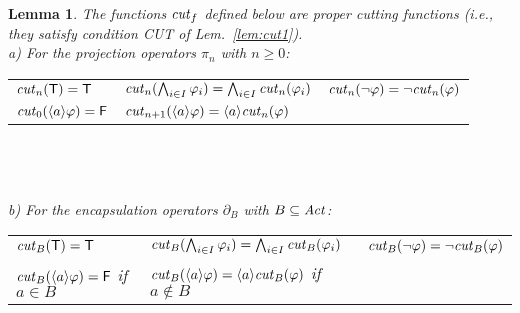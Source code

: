 \documentclass{eptcs}
\def\enc{\partial}
\def\true{{\sf T}}
\def\false{{\sf F}}
\newtheorem{lemm}{Lemma}
\newenvironment{lemma}{\begin{lemm} \rm }{\end{lemm}}
\newcommand{\diam}[1]{\langle#1\rangle}
\begin{document}
\begin{lemma} 
\label{lem:cut3}
The functions ${\it cut}_f$ defined below are proper cutting functions (i.e., they satisfy condition CUT of Lem.~\ref{lem:cut1}).\vspace{4mm}\\
a) For the projection operators $\pi_n$ with $n\geq 0$:\vspace{2mm}\\
\begin{tabular}{lll}
${\it cut}_n(\true) = \true$ &
${\it cut}_n(\bigwedge_{i \in I} \varphi_i) = \bigwedge_{i \in I} {\it cut}_n(\varphi_i)$ &
${\it cut}_n(\neg \varphi) = \neg {\it cut}_n(\varphi)$ \vspace{2mm} \\
${\it cut}_0(\diam{a} \varphi) = \false$ & ${\it cut}_{n+1}(\diam{a}\varphi) = \diam{a}{\it cut}_n(\varphi)$
\end{tabular}
\\ \\ \\
b) For the encapsulation operators $\enc_B$ with $B \subseteq {\it Act}$:\vspace{2mm}\\
\begin{tabular}{lll}
${\it cut}_B(\true) = \true$ &
${\it cut}_B(\bigwedge_{i \in I} \varphi_i) = \bigwedge_{i \in I} {\it cut}_B(\varphi_i)$ &
${\it cut}_B(\neg \varphi) = \neg {\it cut}_B(\varphi)$ \vspace{2mm} \\
${\it cut}_B(\diam{a} \varphi) = \false$ if $a \in B$ &
${\it cut}_B(\diam{a}\varphi) = \diam{a}{\it cut}_B(\varphi)$ if $a \not \in B$
\end{tabular}
\end{lemma}
\end{document}
